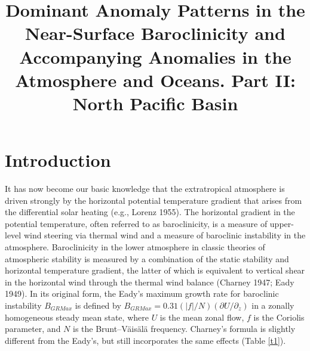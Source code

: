 \documentclass[twocol]{ametsocv6.2}
\title{Dominant Anomaly Patterns in the Near-Surface 
Baroclinicity and Accompanying
Anomalies in the Atmosphere and Oceans. 
Part II: North Pacific Basin}
\affiliation{\aff{a}Japan Agency for Marine-Earth Science and Technology, Yokohama,
Kanagawa, Japan}
\begin{document}
\maketitle

%
%
%


%

\section{Introduction}

It has now become our basic
knowledge that the extratropical
atmosphere is driven strongly by the horizontal
potential temperature gradient that arises from the
differential solar heating (e.g., Lorenz 1955). The horizontal
gradient in the potential temperature, often referred
to as baroclinicity, is a measure of upper-level wind
steering via thermal wind and a measure of baroclinic
instability in the atmosphere. Baroclinicity in the lower
atmosphere in classic theories of atmospheric stability is
measured by a combination of the static stability and
horizontal temperature gradient, the latter of which is
equivalent to vertical shear in the horizontal wind through
the thermal wind balance (Charney 1947; Eady 1949). In
its original form, the Eady's maximum growth rate for
baroclinic instability $B_{GRMax}$ is defined by $B_{GRMax} =
0.31(|f|/N)(\partial U/\partial_z)$ in a zonally homogeneous steady
mean state, where $U$ is the mean zonal flow, $f$ is the
Coriolis parameter, and $N$ is the Brunt--V\"ais\"al\"a frequency.
Charney's formula is slightly different from the Eady's,
but still incorporates the same effects (Table \ref{t1}).
\end{document}
